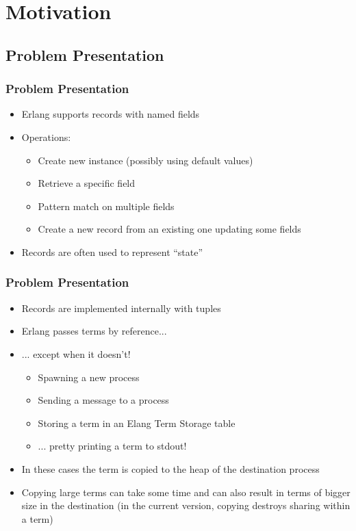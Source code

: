 \section{Motivation}

\subsection[Problem Presentation]{Problem Presentation}
\begin{frame}
  \frametitle{Problem Presentation}
  
  \begin{itemize}
  \item Erlang supports records with named fields
  \item Operations:
    \begin{itemize}
    \item Create new instance (possibly using default values)
    \item Retrieve a specific field
    \item Pattern match on multiple fields
    \item Create a new record from an existing one updating some fields
    \end{itemize}
  \item Records are often used to represent ``state''
  \end{itemize}
\end{frame}

\begin{frame}
  \frametitle{Problem Presentation}
  \begin{itemize}
  \item Records are implemented internally with tuples
  \item Erlang passes terms by reference...
    \pause
  \item ... except when it doesn't!
    \begin{itemize}
    \item Spawning a new process
    \item Sending a message to a process
    \item Storing a term in an Elang Term Storage table
    \item ... pretty printing a term to stdout!
    \end{itemize}
    \pause
  \item In these cases the term is copied to the heap of the destination
    process
  \item Copying large terms can take some time and can also result in terms of
    bigger size in the destination (in the current version, copying destroys
    sharing within a term)
  \end{itemize}
\end{frame}

